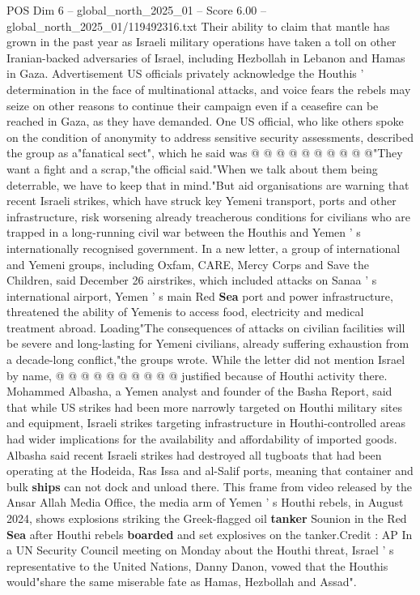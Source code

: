 \begin{textsample}{POS Dim 6 – global\_north\_2025\_01 – Score 6.00 – global\_north\_2025\_01/119492316.txt}
Their ability to claim that mantle has grown in the past year as Israeli military operations have taken a toll on other Iranian-backed adversaries of Israel, including Hezbollah in Lebanon and Hamas in Gaza.
Advertisement US officials privately acknowledge the Houthis ' determination in the face of multinational attacks, and voice fears the rebels may seize on other reasons to continue their campaign even if a ceasefire can be reached in Gaza, as they have demanded.
One US official, who like others spoke on the condition of anonymity to address sensitive security assessments, described the group as a"fanatical sect", which he said was @ @ @ @ @ @ @ @ @ @"They want a fight and a scrap,"the official said."When we talk about them being deterrable, we have to keep that in mind."But aid organisations are warning that recent Israeli strikes, which have struck key Yemeni transport, ports and other infrastructure, risk worsening already treacherous conditions for civilians who are trapped in a long-running civil war between the Houthis and Yemen ' s internationally recognised government.
In a new letter, a group of international and Yemeni groups, including Oxfam, CARE, Mercy Corps and Save the Children, said December 26 airstrikes, which included attacks on Sanaa ' s international airport, Yemen ' s main Red \textbf{Sea} port and power infrastructure, threatened the ability of Yemenis to access food, electricity and medical treatment abroad.
Loading"The consequences of attacks on civilian facilities will be severe and long-lasting for Yemeni civilians, already suffering exhaustion from a decade-long conflict,"the groups wrote.
While the letter did not mention Israel by name, @ @ @ @ @ @ @ @ @ @ justified because of Houthi activity there.
Mohammed Albasha, a Yemen analyst and founder of the Basha Report, said that while US strikes had been more narrowly targeted on Houthi military sites and equipment, Israeli strikes targeting infrastructure in Houthi-controlled areas had wider implications for the availability and affordability of imported goods.
Albasha said recent Israeli strikes had destroyed all tugboats that had been operating at the Hodeida, Ras Issa and al-Salif ports, meaning that container and bulk \textbf{ships} can not dock and unload there.
This frame from video released by the Ansar Allah Media Office, the media arm of Yemen ' s Houthi rebels, in August 2024, shows explosions striking the Greek-flagged oil \textbf{tanker} Sounion in the Red \textbf{Sea} after Houthi rebels \textbf{boarded} and set explosives on the tanker.Credit : AP In a UN Security Council meeting on Monday about the Houthi threat, Israel ' s representative to the United Nations, Danny Danon, vowed that the Houthis would"share the same miserable fate as Hamas, Hezbollah and Assad".

\end{textsample}
